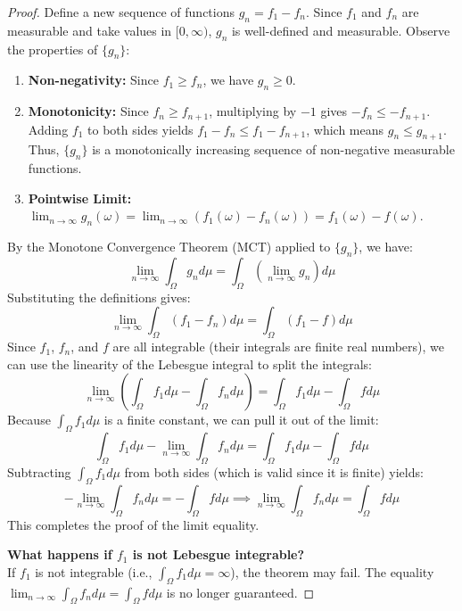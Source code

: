 \documentclass[11pt]{article}
\begin{document}
\begin{proof}
Define a new sequence of functions $g_n = f_1 - f_n$. 
Since $f_1$ and $f_n$ are measurable and take values in $[0, \infty)$, $g_n$ is well-defined and measurable. 
Observe the properties of $\{g_n\}$:
\begin{enumerate}
    \item \textbf{Non-negativity:} Since $f_1 \ge f_n$, we have $g_n \ge 0$.
    \item \textbf{Monotonicity:} Since $f_n \ge f_{n+1}$, multiplying by $-1$ gives $-f_n \le -f_{n+1}$. Adding $f_1$ to both sides yields $f_1 - f_n \le f_1 - f_{n+1}$, which means $g_n \le g_{n+1}$. Thus, $\{g_n\}$ is a monotonically increasing sequence of non-negative measurable functions.
    \item \textbf{Pointwise Limit:} $\lim_{n \to \infty} g_n(\omega) = \lim_{n \to \infty} (f_1(\omega) - f_n(\omega)) = f_1(\omega) - f(\omega)$.
\end{enumerate}
By the Monotone Convergence Theorem (MCT) applied to $\{g_n\}$, we have:
\[ \lim_{n \to \infty} \int_\Omega g_n d\mu = \int_\Omega \left( \lim_{n \to \infty} g_n \right) d\mu \]
Substituting the definitions gives:
\[ \lim_{n \to \infty} \int_\Omega (f_1 - f_n) d\mu = \int_\Omega (f_1 - f) d\mu \]
Since $f_1$, $f_n$, and $f$ are all integrable (their integrals are finite real numbers), we can use the linearity of the Lebesgue integral to split the integrals:
\[ \lim_{n \to \infty} \left( \int_\Omega f_1 d\mu - \int_\Omega f_n d\mu \right) = \int_\Omega f_1 d\mu - \int_\Omega f d\mu \]
Because $\int_\Omega f_1 d\mu$ is a finite constant, we can pull it out of the limit:
\[ \int_\Omega f_1 d\mu - \lim_{n \to \infty} \int_\Omega f_n d\mu = \int_\Omega f_1 d\mu - \int_\Omega f d\mu \]
Subtracting $\int_\Omega f_1 d\mu$ from both sides (which is valid since it is finite) yields:
\[ - \lim_{n \to \infty} \int_\Omega f_n d\mu = - \int_\Omega f d\mu \implies \lim_{n \to \infty} \int_\Omega f_n d\mu = \int_\Omega f d\mu \]
This completes the proof of the limit equality.

\vspace{1em}
\noindent\textbf{What happens if $f_1$ is not Lebesgue integrable?} \\
If $f_1$ is not integrable (i.e., $\int_\Omega f_1 d\mu = \infty$), the theorem may fail. The equality $\lim_{n\to\infty} \int_\Omega f_n d\mu = \int_\Omega f d\mu$ is no longer guaranteed. 


\end{proof}
\end{document}
